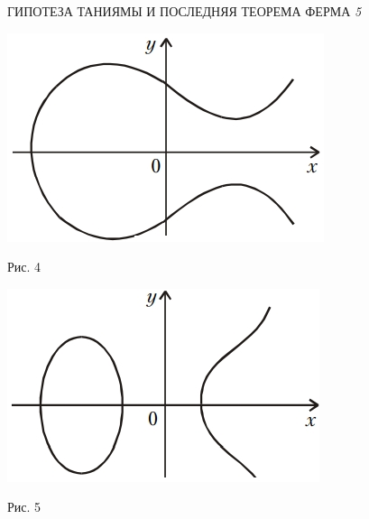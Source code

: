 %

\pagestyle{empty}

\begin{center}
\scriptsize{\qquad \qquad \qquad \qquad \quad \qquad \qquad \qquad \qquad \qquad ГИПОТЕЗА ТАНИЯМЫ И ПОСЛЕДНЯЯ ТЕОРЕМА ФЕРМА \qquad \qquad \qquad \qquad \qquad \qquad \qquad \qquad \qquad } \large{\textit{5}}
\end{center}
\begin{multicols}{3}

\begin{left}
\includegraphics[scale=0.5]{image1}
\end{left}
\begin{left}
\par Рис. 4 
\par 
\end{left}
\begin{left}
\includegraphics[scale=0.5]{image2}
\end{left}
\begin{left}
\par Рис. 5 
\par
\end{left}


\end{multicols}
